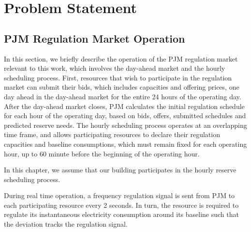 %
%


\section{Problem Statement}
\label{sec:problem_statement}


\subsection{PJM Regulation Market Operation }

In this section, we briefly describe the operation of the PJM regulation market relevant to this work, which involves the day-ahead market and the hourly scheduling process.
First, resources that wish to participate in the regulation market can submit their bids, which includes capacities and offering prices, one day ahead in the day-ahead market for the entire 24 hours of the operating day. 
After the day-ahead market closes, PJM calculates the initial regulation schedule for each hour of the operating day, based on bids, offers, submitted schedules and predicted reserve needs. %
The hourly scheduling process operates at an overlapping time frame, and allows participating resources to declare their regulation capacities and baseline consumptions, which must remain fixed for each operating hour, up to 60 minute before the beginning of the operating hour.
\begin{assumption}
In this chapter, we assume that our building participates in the hourly reserve scheduling process.
\end{assumption}

During real time operation, a frequency regulation signal is sent from PJM to each participating resource every 2 seconds. In turn, the resource is required to regulate its instantaneous electricity consumption around its baseline such that the deviation tracks the regulation signal.

